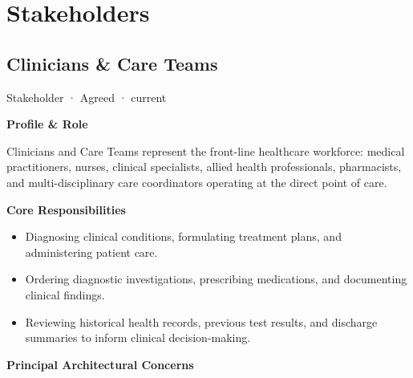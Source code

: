 \chapter{Stakeholders}

\section{Clinicians \& Care Teams}

\label{element:37264af5adb64b37b7537e3d48b6747b}
{\small Stakeholder · Agreed · current}\par

\par\medskip\textbf{Profile \& Role}\par


Clinicians and Care Teams represent the front-line healthcare workforce: medical practitioners, nurses, clinical specialists, allied health professionals, pharmacists, and multi-disciplinary care coordinators operating at the direct point of care.



\par\medskip\textbf{Core Responsibilities}\par


\begin{itemize}


\item Diagnosing clinical conditions, formulating treatment plans, and administering patient care.

\item Ordering diagnostic investigations, prescribing medications, and documenting clinical findings.

\item Reviewing historical health records, previous test results, and discharge summaries to inform clinical decision-making.

\end{itemize}


\par\medskip\textbf{Principal Architectural Concerns}\par


